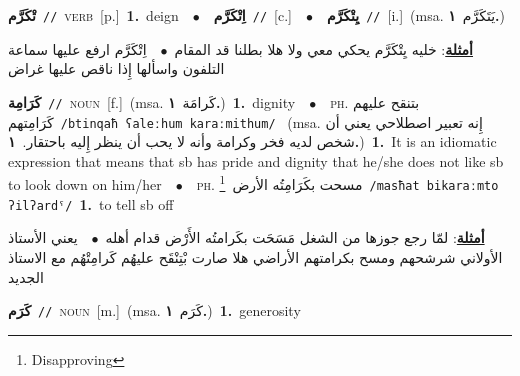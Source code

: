 \documentclass[10pt,a4paper,twoside]{article} %
\begin{document}
\begin{multicols}{2}
{\setlength\topsep{0pt}\textbf{\foreignlanguage{arabic}{تْكَرَّم}}\ {\color{gray}\texttt{//}\color{black}}\ \textsc{verb}\ [p.]\ \textbf{1.}~deign\ \ $\bullet$\ \ \setlength\topsep{0pt}\textbf{\foreignlanguage{arabic}{اِتْكَرَّم}}\ {\color{gray}\texttt{//}\color{black}}\ [c.]\ \ $\bullet$\ \ \setlength\topsep{0pt}\textbf{\foreignlanguage{arabic}{يِتْكَرَّم}}\ {\color{gray}\texttt{//}\color{black}}\ [i.]\ \color{gray}(msa. \foreignlanguage{arabic}{يَتَكَرَّم}~\foreignlanguage{arabic}{\textbf{١.}})\color{black}\  \begin{flushright}\color{gray}\foreignlanguage{arabic}{\textbf{\underline{\foreignlanguage{arabic}{أمثلة}}}: خليه يِتْكَرَّم يحكي معي ولا هلا بطلنا قد المقام\ $\bullet$\ \  اِتْكَرَّم ارفع عليها سماعة التلفون واسألها إِذا ناقص عليها غراض}\end{flushright}\color{black}} \vspace{2mm}

{\setlength\topsep{0pt}\textbf{\foreignlanguage{arabic}{كَرَامِة}}\ {\color{gray}\texttt{//}\color{black}}\ \textsc{noun}\ [f.]\ \color{gray}(msa. \foreignlanguage{arabic}{كَرامَة}~\foreignlanguage{arabic}{\textbf{١.}})\color{black}\ \textbf{1.}~dignity\ \ $\bullet$\ \ \textsc{ph.} \color{gray} \foreignlanguage{arabic}{بتنقح عليهم كَرَامِتهم}\color{black}\ {\color{gray}\texttt{/{\sffamily btinqaħ ʕaleːhum karaːmithum}/}\color{black}}\ \color{gray} (msa. \foreignlanguage{arabic}{إِنه تعبير اصطلاحي يعني أن شخص لديه فخر وكرامة وأنه لا يحب أن ينظر إِليه باحتقار.}~\foreignlanguage{arabic}{\textbf{١.}})\color{black}\ \textbf{1.}~It is an idiomatic expression that means that sb has pride and dignity that he/she does not like sb to look down on him/her\ \ $\bullet$\ \ \textsc{ph.} \color{gray} \foreignlanguage{arabic}{مسحت بكَرَامِتُه الأرض}\color{black}\ \footnote{Disapproving}\ {\color{gray}\texttt{/{\sffamily masħat bikaraːmto ʔilʔardˤ}/}\color{black}}\ \textbf{1.}~to tell sb off\  \begin{flushright}\color{gray}\foreignlanguage{arabic}{\textbf{\underline{\foreignlanguage{arabic}{أمثلة}}}: لمّا رجع جوزها من الشغل مَسَحَت بكَرامتُه الأَرْض قدام أهله\ $\bullet$\ \  يعني الأستاذ الأولاني شرشحهم ومسح بكرامتهم الأراضي هلا صارت بْتِنْقَح عليهُم كَرامِتْهُم مع الاستاذ الجديد}\end{flushright}\color{black}} \vspace{2mm}

{\setlength\topsep{0pt}\textbf{\foreignlanguage{arabic}{كَرَم}}\ {\color{gray}\texttt{//}\color{black}}\ \textsc{noun}\ [m.]\ \color{gray}(msa. \foreignlanguage{arabic}{كَرَم}~\foreignlanguage{arabic}{\textbf{١.}})\color{black}\ \textbf{1.}~generosity\ } \vspace{2mm}


\end{multicols}
\end{document}
